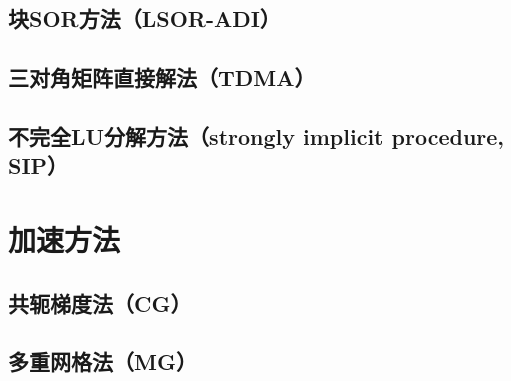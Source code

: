 \documentclass[11pt]{article}
\begin{document}
\subsection{块SOR方法（LSOR-ADI）}

\subsection{三对角矩阵直接解法（TDMA）\label{ch:tdma}}

\subsection{不完全LU分解方法（strongly implicit procedure, SIP）}

\section{加速方法}
\subsection{共轭梯度法（CG）}

\subsection{多重网格法（MG）}

\newpage


\end{document}
